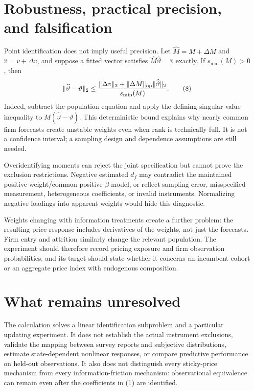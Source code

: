 \documentclass[11pt,a4paper]{article}
\begin{document}
\section{Robustness, practical precision, and falsification}
Point identification does not imply useful precision. Let $\widehat M=M+\Delta M$ and $\widehat v=v+\Delta v$, and suppose a fitted vector satisfies $\widehat M\widehat\vartheta=\widehat v$ exactly. If $s_{\min}(M)>0$, then
\[
 \|\widehat\vartheta-\vartheta\|_2
 \le
 \frac{\|\Delta v\|_2+\|\Delta M\|_{\rm op}\|\widehat\vartheta\|_2}
 {s_{\min}(M)}.
 \tag{8}
\]
Indeed, subtract the population equation and apply the defining singular-value inequality to $M(\widehat\vartheta-\vartheta)$. This deterministic bound explains why nearly common firm forecasts create unstable weights even when rank is technically full. It is not a confidence interval; a sampling design and dependence assumptions are still needed.

Overidentifying moments can reject the joint specification but cannot prove the exclusion restrictions. Negative estimated $d_f$ may contradict the maintained positive-weight/common-positive-$\beta$ model, or reflect sampling error, misspecified measurement, heterogeneous coefficients, or invalid instruments. Normalizing negative loadings into apparent weights would hide this diagnostic.

Weights changing with information treatments create a further problem: the resulting price response includes derivatives of the weights, not just the forecasts. Firm entry and attrition similarly change the relevant population. The experiment should therefore record pricing exposure and firm observation probabilities, and its target should state whether it concerns an incumbent cohort or an aggregate price index with endogenous composition.
\section{What remains unresolved}
The calculation solves a linear identification subproblem and a particular updating experiment. It does not establish the actual instrument exclusions, validate the mapping between survey reports and subjective distributions, estimate state-dependent nonlinear responses, or compare predictive performance on held-out observations. It also does not distinguish every sticky-price mechanism from every information-friction mechanism: observational equivalence can remain even after the coefficients in (1) are identified.
\end{document}
